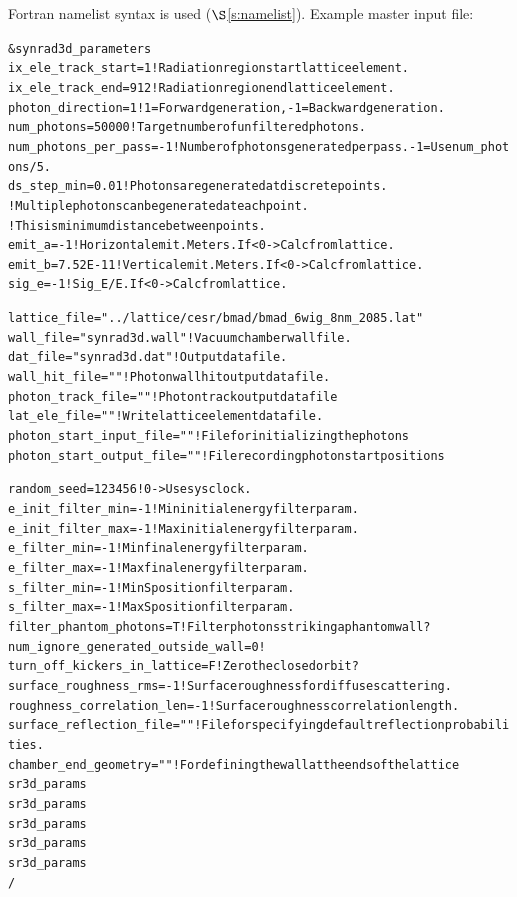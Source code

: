 \documentclass[11pt,openany]{report}
\newcommand{\sref}[1]{$\S$\ref{#1}}
\newlength{\ExBeg}
\newlength{\ExEnd}
\newenvironment{example}
  {\vspace{\ExBeg} \begin{alltt}}
  {\end{alltt} \vspace{\ExEnd}}
\begin{document}
Fortran namelist syntax is used (\sref{s:namelist}). Example master input file:
\begin{example}
  &synrad3d_parameters
    ix_ele_track_start   = 1      ! Radiation region start lattice element.
    ix_ele_track_end     = 912    ! Radiation region end lattice element.
    photon_direction     = 1      ! 1 = Forward generation, -1 = Backward generation.
    num_photons          = 50000  ! Target number of unfiltered photons.
    num_photons_per_pass = -1     ! Number of photons generated per pass. -1 = Use num_photons/5.
    ds_step_min          = 0.01   ! Photons are generated at discrete points. 
                              ! Multiple photons can be generated at each point.
                              ! This is minimum distance between points.
    emit_a       = -1         ! Horizontal emit. Meters. If < 0 -> Calc from lattice.
    emit_b       = 7.52E-11   ! Vertical emit.  Meters. If < 0 -> Calc from lattice.
    sig_e        = -1         ! Sig_E/E. If < 0 -> Calc from lattice.

    lattice_file = "../lattice/cesr/bmad/bmad_6wig_8nm_2085.lat" 
    wall_file    = "synrad3d.wall"   ! Vacuum chamber wall file.
    dat_file     = "synrad3d.dat"    ! Output data file.
    wall_hit_file = ""               ! Photon wall hit output data file.
    photon_track_file = ""           ! Photon track output data file
    lat_ele_file  = ""               ! Write lattice element data file.
    photon_start_input_file  = ""    ! File for initializing the photons
    photon_start_output_file = ""    ! File recording photon start positions

    random_seed = 123456             ! 0 -> Use sys clock.
    e_init_filter_min = -1           ! Min initial energy filter param.
    e_init_filter_max = -1           ! Max initial energy filter param.
    e_filter_min = -1                ! Min final energy filter param.
    e_filter_max = -1                ! Max final energy filter param.
    s_filter_min = -1                ! Min S position filter param.
    s_filter_max = -1                ! Max S position filter param.
    filter_phantom_photons = T       ! Filter photons striking a phantom wall?
    num_ignore_generated_outside_wall = 0    !
    turn_off_kickers_in_lattice = F          ! Zero the closed orbit?
    surface_roughness_rms       = -1         ! Surface roughness for diffuse scattering.
    roughness_correlation_len   = -1         ! Surface roughness correlation length.
    surface_reflection_file     = ""         ! File for specifying default reflection probabilities.
    chamber_end_geometry = ""                   ! For defining the wall at the ends of the lattice
    sr3d_params%
    sr3d_params%
    sr3d_params%
    sr3d_params%
    sr3d_params%
  /
\end{example}
\end{document}
